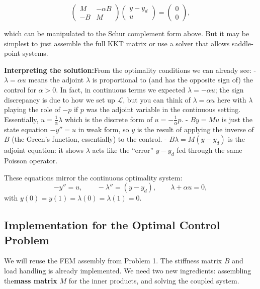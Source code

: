 \documentclass[a4paper,10pt]{article}
\begin{document}
\[
	\begin{pmatrix}
		M  & -\alpha B \\
		-B & M
	\end{pmatrix}
	\begin{pmatrix} y - y_d \\ u \end{pmatrix}
	= \begin{pmatrix} 0 \\ 0 \end{pmatrix},
\]

which can be manipulated to the Schur complement form above. But it may be simplest to just assemble the full KKT matrix or use a solver that allows saddle-point systems.

\textbf{Interpreting the solution:}From the optimality conditions we can already see:
- \(\lambda = \alpha u\) means the adjoint \(\lambda\) is proportional to (and has the opposite sign of) the control for \(\alpha>0\). In fact, in continuous terms we expected \(\lambda = -\alpha u\); the sign discrepancy is due to how we set up \(\mathcal{L}\), but you can think of \(\lambda = \alpha u\) here with \(\lambda\) playing the role of \(-p\) if \(p\) was the adjoint variable in the continuous setting. Essentially, \(u = \frac{1}{\alpha}\lambda\) which is the discrete form of \(u = -\frac{1}{\alpha}p\).
- \(B y = M u\) is just the state equation \(-y'' = u\) in weak form, so \(y\) is the result of applying the inverse of \(B\) (the Green's function, essentially) to the control.
- \(B \lambda = M(y - y_d)\) is the adjoint equation: it shows \(\lambda\) acts like the “error” \(y-y_d\) fed through the same Poisson operator.

These equations mirror the continuous optimality system:
\[ -y'' = u, \qquad -\lambda'' = (y - y_d), \qquad \lambda + \alpha u = 0, \]
with \(y(0)=y(1)=\lambda(0)=\lambda(1)=0\).

\subsection{ Implementation for the Optimal Control Problem}
We will reuse the FEM assembly from Problem 1. The stiffness matrix \(B\) and load handling is already implemented. We need two new ingredients: assembling the\textbf{mass matrix} \(M\) for the inner products, and solving the coupled system.
\end{document}
